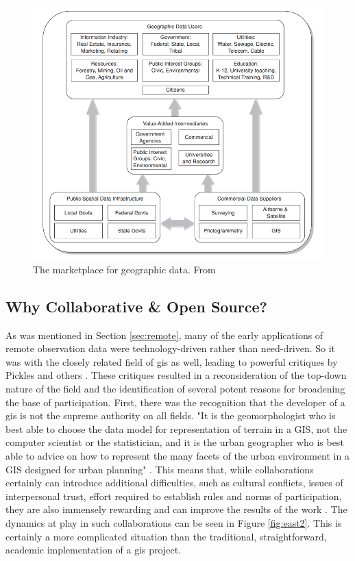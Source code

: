 \begin{figure}[!htb]
	\centering
	\includegraphics[scale=0.4]{Figures/chap2/GISMarketplace.png}
	\caption[The marketplace for geographic data]{The marketplace for geographic data. From \cite{cowenAvailabilityGeographicData2007}}
	\label{fig:marketplace}
\end{figure}

\subsection{Why Collaborative \& Open Source?} \label{sec:collaborative}

As was mentioned in Section \ref{sec:remote}, many of the early applications of remote observation data were technology-driven rather than need-driven. So it was with the closely related field of \ac{gis} as well, leading to powerful critiques by Pickles and others \cite{picklesGroundTruthSocial1994}. These critiques resulted in a reconsideration of the top-down nature of the field and the identification of several potent reasons for broadening the base of participation. First, there was the recognition that the developer of a \ac{gis} is not the supreme authority on all fields. "It is the geomorphologist who is best able to choose the data model for representation of terrain in a GIS, not the computer scientist or the statistician, and it is the urban geographer who is best able to advice on how to represent the many facets of the urban environment in a GIS designed for urban planning" \cite{goodchildGeographicInformationSystems1994}. This means that, while collaborations certainly can introduce additional difficulties, such as cultural conflicts, issues of interpersonal trust, effort required to establish rules and norms of participation, they are also immensely rewarding and can improve the results of the work \cite{tullochInstitutionalGeographicInformation2007}. The dynamics at play in such collaborations can be seen in Figure \ref{fig:east2}. This is certainly a more complicated situation than the traditional, straightforward, academic implementation of a \ac{gis} project.

